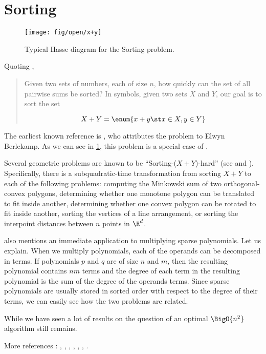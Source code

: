 

\section{Sorting \XY}
\label{tree:open:xy}

\begin{figure}
	\centering
	\texttt{[image: fig/open/x+y]}
	\caption{Typical Hasse diagram for the Sorting \XY problem.}
	\label{fig:open:xy}
\end{figure}

Quoting \cite{orourke:2012:sortxy},

\begin{quotation}
Given two sets of numbers, each of size $n$, how quickly can the set of all
pairwise sums be sorted? In symbols, given two sets $X$ and $Y$, our goal is to
sort the set

$$ X + Y = \enum{x + y \st x \in X, y \in Y} $$

\end{quotation}

The earliest known reference is \citet*{fredman:1976}, who attributes
the problem to Elwyn Berlekamp. As we can see in \ref{fig:open:xy}, this
problem is a special case of .

Several geometric problems are known to be ``Sorting-($X + Y$)-hard'' (see
\cite{barrera1996finding} and \cite{barequet2001polygon}). Specifically, there
is a subquadratic-time transformation from sorting $X + Y$ to each of the
following problems: computing the Minkowski sum of two orthogonal-convex
polygons, determining whether one monotone polygon can be translated to fit
inside another, determining whether one convex polygon can be rotated to fit
inside another, sorting the vertices of a line arrangement, or sorting the
interpoint distances between $n$ points in $\R^d$.

\citet{fredman:1976} also mentions an immediate application to multiplying sparse
polynomials. Let us explain. When we multiply
polynomials, each of the operands can be decomposed in terms. If polynomials
$p$ and $q$ are of size $n$ and $m$, then the resulting polynomial contains
$nm$ terms and the degree of each term in the resulting polynomial is the sum
of the degree of the operands terms. Since sparse polynomials are usually
stored in sorted order with respect to the degree of their terms, we can easily
see how the two problems are related.

While we have seen a lot of results on  the question of an
optimal $\BigO{n^2}$ algorithm still remains.

More references : \cite{orourke:2012:sortxy}, \cite{kahn:1995},
\cite{dietzfelbinger1989lower}, \cite{steiger1995pseudo},
\cite{lambert:1990}, \cite{erickson:1999},
\cite{bremner2012necklaces}.



